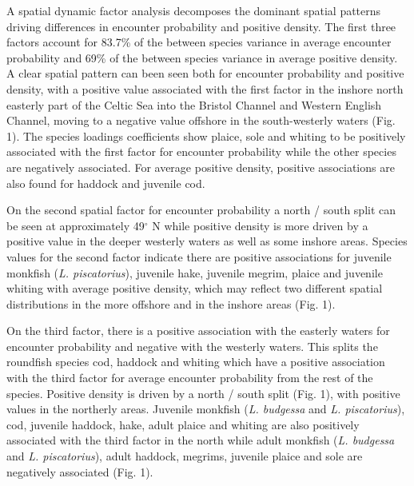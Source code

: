 \documentclass[12pt]{article}
\begin{document}
\begin{linenumbers}

A spatial dynamic factor analysis decomposes the dominant spatial patterns
driving differences in encounter probability and positive density. The first
three factors account for 83.7\% of the between
species variance in average encounter probability and 69\% of the between
species variance in average positive density. A clear spatial pattern can been
seen both for encounter probability and positive density, with a positive value
associated with the first factor in the inshore north easterly part of the
Celtic Sea into the Bristol Channel and Western English Channel, moving to a
negative value offshore in the south-westerly waters (Fig. 1).  The species
loadings coefficients show plaice, sole and whiting to be positively associated
with the first factor for encounter probability while the other species are
negatively associated. For average positive density, positive associations are
also found for haddock and juvenile cod.  

On the second spatial factor for encounter probability a north / south split
can be seen at approximately 49$^{\circ}$ N while positive density is more
driven by a positive value in the deeper westerly waters as well as some
inshore areas. Species values for the second factor indicate there are positive
associations for juvenile monkfish (\emph{L. piscatorius}), juvenile hake,
juvenile megrim, plaice and juvenile whiting with average positive density,
which may reflect two different spatial distributions in the more offshore and
in the inshore areas (Fig. 1).

On the third factor, there is a positive association with the easterly waters
for encounter probability and negative with the westerly waters. This
 splits the
roundfish species cod, haddock and whiting which have a positive
association with the third factor for average encounter probability from the
rest of the species.  Positive
density is driven by a north / south split (Fig. 1), with positive values in
the northerly areas. Juvenile monkfish (\emph{L.  budgessa} and \emph{L.
	piscatorius}), cod, juvenile haddock, hake, adult plaice and whiting
are also positively associated with the third factor in the north while adult
monkfish (\emph{L. budgessa} and \emph{L.  piscatorius}), adult haddock,
megrims, juvenile plaice and sole are negatively associated  (Fig. 1).


\end{linenumbers}
\end{document}
